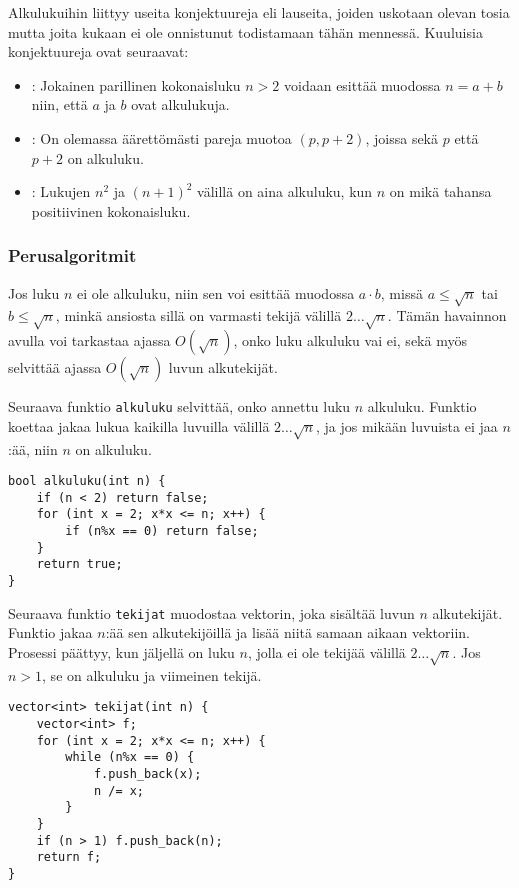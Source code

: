 Alkulukuihin liittyy useita konjektuureja
eli lauseita, joiden uskotaan olevan tosia mutta
joita kukaan ei ole onnistunut todistamaan tähän mennessä.
Kuuluisia konjektuureja ovat seuraavat:

\begin{itemize}
\item {}:
Jokainen parillinen kokonaisluku $n>2$ voidaan esittää
muodossa $n=a+b$ niin, että $a$ ja $b$
ovat alkulukuja.
\item {}:
On olemassa äärettömästi pareja muotoa $(p,p+2)$,
joissa sekä $p$ että $p+2$ on alkuluku.
\item {}:
Lukujen $n^2$ ja $(n+1)^2$ välillä on aina alkuluku,
kun $n$ on mikä tahansa positiivinen kokonaisluku.
\end{itemize}

\subsubsection{Perusalgoritmit}

Jos luku $n$ ei ole alkuluku,
niin sen voi esittää muodossa $a \cdot b$,
missä $a \le \sqrt n$ tai $b \le \sqrt n$,
minkä ansiosta sillä on varmasti
tekijä välillä $2 \ldots \sqrt n$.
Tämän havainnon avulla voi tarkastaa ajassa $O(\sqrt n)$,
onko luku alkuluku vai ei,
sekä myös selvittää ajassa $O(\sqrt n)$
luvun alkutekijät.

Seuraava funktio \texttt{alkuluku} selvittää,
onko annettu luku $n$ alkuluku.
Funktio koettaa jakaa lukua kaikilla luvuilla
välillä $2 \ldots \sqrt n$, ja jos mikään
luvuista ei jaa $n$:ää, niin $n$ on alkuluku.

\begin{lstlisting}
bool alkuluku(int n) {
    if (n < 2) return false;
    for (int x = 2; x*x <= n; x++) {
        if (n%x == 0) return false;
    }
    return true;
}
\end{lstlisting}

\noindent
Seuraava funktio \texttt{tekijat} muodostaa
vektorin, joka sisältää luvun $n$
alkutekijät.
Funktio jakaa $n$:ää sen alkutekijöillä ja lisää
niitä samaan aikaan vektoriin.
Prosessi päättyy, kun jäljellä on luku $n$,
jolla ei ole tekijää välillä $2 \ldots \sqrt n$.
Jos $n>1$, se on alkuluku ja viimeinen tekijä.

\begin{lstlisting}
vector<int> tekijat(int n) {
    vector<int> f;
    for (int x = 2; x*x <= n; x++) {
        while (n%x == 0) {
            f.push_back(x);
            n /= x;
        }
    }
    if (n > 1) f.push_back(n);
    return f;
}
\end{lstlisting}

